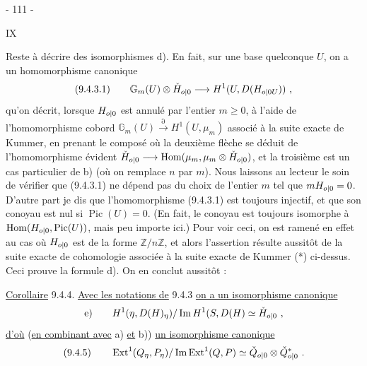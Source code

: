 \begin{center}- 111 -\end{center}\hfill IX

Reste à décrire des isomorphismes d). En fait, sur une base quelconque $U$, on a un homomorphisme canonique
\[
 (9.4.3.1)\qquad \mathbb G_m(U)\otimes\check H_{{o|0}}\longrightarrow H^1(U,D(H_{{o|0}U}))\ ,
\]
qu'on décrit, lorsque $H_{{o|0}}$ est annulé par l'entier $m\geq0$, à l'aide de l'homomorphisme cobord $\mathbb G_m(U)\xrightarrow{\partial}H^1(U,\mu_m)$ associé à la suite exacte de Kummer, en prenant le composé
où la deuxième flèche se déduit de l'homomorphisme évident $\check H_{{o|0}}\longrightarrow\operatorname{Hom}(\mu_m,\mu_m\otimes\check H_{{o|0}})$, et la troisième est un cas particulier de b) (où on remplace $n$ par $m$). Nous laissons au lecteur le soin de vérifier que (9.4.3.1) ne dépend pas du choix de l'entier $m$ tel que $mH_{{o|0}}=0$.
D'autre part je dis que l'homomorphisme (9.4.3.1) est toujours injectif, et que son conoyau est nul si $\operatorname{Pic}(U)=0$. (En fait, le conoyau est toujours isomorphe à $\operatorname{Hom}(H_{{o|0}},\operatorname{Pic}(U))$, mais peu importe ici.) Pour voir ceci, on est ramené en effet au cas où $H_{{o|0}}$ est de la forme $\mathbb Z/n\mathbb Z$, et alors l'assertion résulte aussitôt de la suite exacte de cohomologie associée à la suite exacte de Kummer (*) ci-dessus. Ceci prouve la formule d). On en conclut aussitôt :

\uline{Corollaire} 9.4.4. \uline{Avec les notations de} 9.4.3 \uline{on a un isomorphisme canonique}
\[
 \text{e)}\qquad H^1(\eta,D(H)_\eta)/\operatorname{Im}H^1(S,D(H)\simeq\check H_{{o|0}}\ ,
\]
\uline{d'où} (\uline{en combinant avec} a) \uline{et} b)) \uline{un isomorphisme canonique}
\[
 (9.4.5)\qquad\operatorname{Ext}^1(Q_\eta,P_\eta)/\operatorname{Im}\operatorname{Ext}^1(Q,P)\simeq\check Q_{{o|0}}\otimes\check Q_{{o|0}}^*\ .
\]
